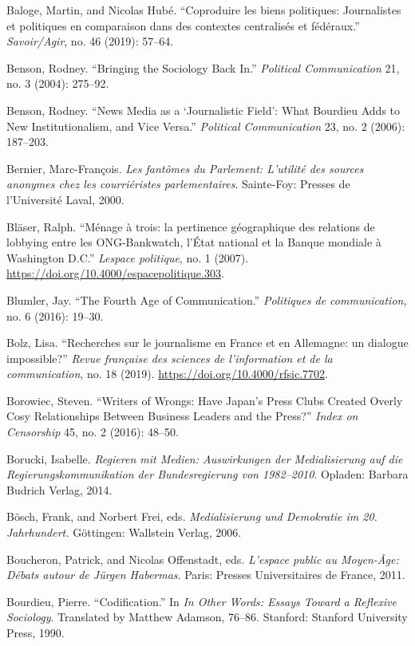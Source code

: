 \documentclass{tufte-handout}
\begin{document}
\begin{hangparas}{.25in}{1}
Baloge, Martin, and Nicolas Hubé. ``Coproduire les biens politiques:
Journalistes et politiques en comparaison dans des contextes centralisés
et fédéraux.'' \emph{Savoir/Agir}, no. 46 (2019): 57--64.

Benson, Rodney. ``Bringing the Sociology Back In.'' \emph{Political
Communication} 21, no. 3 (2004): 275--92.

Benson, Rodney. ``News Media as a `Journalistic Field': What Bourdieu
Adds to New Institutionalism, and Vice Versa.'' \emph{Political
Communication} 23, no. 2 (2006): 187--203.

Bernier, Marc-François. \emph{Les fantômes du Parlement: L'utilité des
sources anonymes chez les courriéristes parlementaires}. Sainte-Foy:
Presses de l'Université Laval, 2000.

Bläser, Ralph. ``Ménage à trois: la pertinence géographique des
relations de lobbying entre les ONG-Bankwatch, l'État national et la
Banque mondiale à Washington D.C.'' \emph{L\textquotesingle espace
politique}, no. 1 (2007).
\url{https://doi.org/10.4000/espacepolitique.303}.

Blumler, Jay. ``The Fourth Age of Communication.'' \emph{Politiques de
communication}, no. 6 (2016): 19--30.

Bolz, Lisa. ``Recherches sur le journalisme en France et en Allemagne:
un dialogue impossible?'' \emph{Revue française des sciences de
l'information et de la communication}, no. 18 (2019).
\url{https://doi.org/10.4000/rfsic.7702}.

Borowiec, Steven. ``Writers of Wrongs: Have Japan's Press Clubs Created
Overly Cosy Relationships Between Business Leaders and the Press?''
\emph{Index on Censorship} 45, no. 2 (2016): 48--50.

Borucki, Isabelle. \emph{Regieren mit Medien: Auswirkungen der
Medialisierung auf die Regierungskommunikation der Bundesregierung von
1982--2010}. Opladen: Barbara Budrich Verlag, 2014.

Bösch, Frank, and Norbert Frei, eds. \emph{Medialisierung und Demokratie
im 20. Jahrhundert.} Göttingen: Wallstein Verlag, 2006.

Boucheron, Patrick, and Nicolas Offenstadt, eds. \emph{L'espace public
au Moyen-Âge: Débats autour de Jürgen Habermas}. Paris: Presses
Universitaires de France, 2011.

Bourdieu, Pierre. ``Codification.'' In \emph{In Other Words: Essays
Toward a Reflexive Sociology}. Translated by Matthew Adamson, 76--86.
Stanford: Stanford University Press, 1990.


\end{hangparas}
\end{document}
